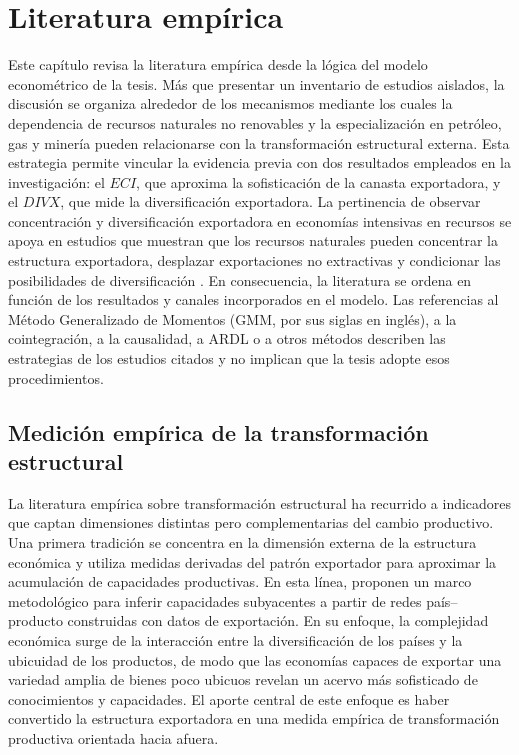 \documentclass[../../TFM.tex]{subfiles}
\begin{document}
    
    \chapter{Literatura empírica}
	\label{chap:literatura-empirica}
	
	Este capítulo revisa la literatura empírica desde la lógica del modelo econométrico de la tesis. Más que presentar un inventario de estudios aislados, la discusión se organiza alrededor de los mecanismos mediante los cuales la dependencia de recursos naturales no renovables y la especialización en petróleo, gas y minería pueden relacionarse con la transformación estructural externa. Esta estrategia permite vincular la evidencia previa con dos resultados empleados en la investigación: el $ECI$, que aproxima la sofisticación de la canasta exportadora, y el $DIVX$, que mide la diversificación exportadora. La pertinencia de observar concentración y diversificación exportadora en economías intensivas en recursos se apoya en estudios que muestran que los recursos naturales pueden concentrar la estructura exportadora, desplazar exportaciones no extractivas y condicionar las posibilidades de diversificación \parencite{Harding2016,Bahar2018,Joya2015,Lashitew2021}. En consecuencia, la literatura se ordena en función de los resultados y canales incorporados en el modelo. Las referencias al Método Generalizado de Momentos (GMM, por sus siglas en inglés), a la cointegración, a la causalidad, a ARDL o a otros métodos describen las estrategias de los estudios citados y no implican que la tesis adopte esos procedimientos.
	
	\section{Medición empírica de la transformación estructural}
	\label{sec:medicion-transformacion-estructural}
	
	La literatura empírica sobre transformación estructural ha recurrido a indicadores que captan dimensiones distintas pero complementarias del cambio productivo. Una primera tradición se concentra en la dimensión externa de la estructura económica y utiliza medidas derivadas del patrón exportador para aproximar la acumulación de capacidades productivas. En esta línea, \textcite{Hidalgo2009} proponen un marco metodológico para inferir capacidades subyacentes a partir de redes país--producto construidas con datos de exportación. En su enfoque, la complejidad económica surge de la interacción entre la diversificación de los países y la ubicuidad de los productos, de modo que las economías capaces de exportar una variedad amplia de bienes poco ubicuos revelan un acervo más sofisticado de conocimientos y capacidades. El aporte central de este enfoque es haber convertido la estructura exportadora en una medida empírica de transformación productiva orientada hacia afuera.
	
\end{document}
